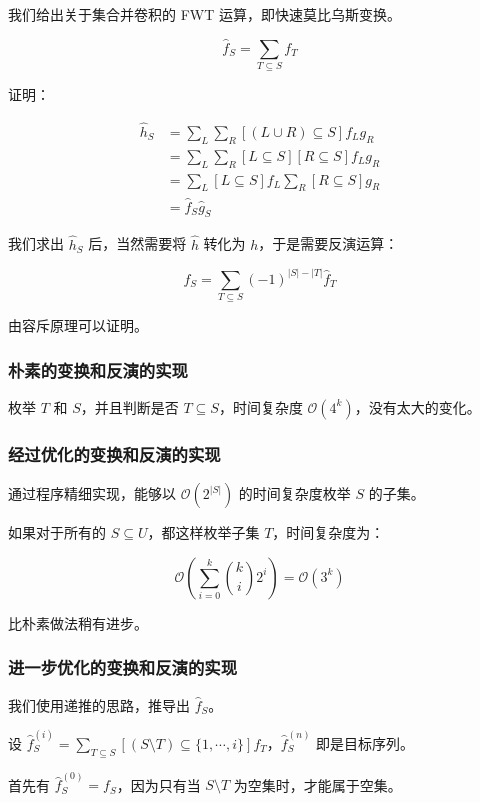 \documentclass{article}
\begin{document}
我们给出关于集合并卷积的 FWT 运算，即快速莫比乌斯变换。

$$\hat f_S=\sum_{T \subseteq S} f_T$$

证明：

$$
\begin{aligned}
    \hat h_S &=\sum_{L} \sum_{R} [(L \cup R) \subseteq S] f_L g_R \\
         &= \sum_{L} \sum_{R} [L \subseteq S][R \subseteq S] f_L g_R \\
         &= \sum_{L} [L \subseteq S] f_L \sum_{R} [R \subseteq S] g_R \\
         &= \hat f_S \hat g_S
\end{aligned}
$$

我们求出 $\hat h_S$ 后，当然需要将 $\hat h$ 转化为 $h$，于是需要反演运算：

$$f_S=\sum_{T \subseteq S} (-1)^{|S|-|T|}\hat f_T$$

由容斥原理可以证明。

\subsubsection*{朴素的变换和反演的实现}

枚举 $T$ 和 $S$，并且判断是否 $T \subseteq S$，时间复杂度 $\mathcal O(4^k)$，没有太大的变化。

\subsubsection*{经过优化的变换和反演的实现}

通过程序精细实现，能够以 $\mathcal O(2^{|S|})$ 的时间复杂度枚举 $S$ 的子集。

如果对于所有的 $S \subseteq U$，都这样枚举子集 $T$，时间复杂度为：

$$\mathcal O\left(\sum_{i=0}^k \binom{k}{i}2^i\right)= \mathcal O(3^k)$$

比朴素做法稍有进步。

\subsubsection*{进一步优化的变换和反演的实现}

我们使用递推的思路，推导出 $\hat f_S$。

设 $\hat f_S^{(i)}=\sum_{T\subseteq S}[(S\setminus T)\subseteq\{1,\cdots,i\}]f_T$，$\hat f_S^{(n)}$ 即是目标序列。

首先有 $\hat f_S^{(0)}=f_S$，因为只有当 $S \setminus T$ 为空集时，才能属于空集。
\end{document}

